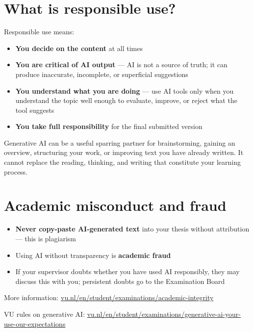 \documentclass[
  11pt,
  a4paper,
]{scrbook}
\providecommand{\tightlist}{%
  \setlength{\itemsep}{0pt}\setlength{\parskip}{0pt}}\usepackage{longtable,booktabs,array}
\begin{document}
\section{What is responsible use?}\label{what-is-responsible-use}

Responsible use means:

\begin{itemize}
\tightlist
\item
  \textbf{You decide on the content} at all times
\item
  \textbf{You are critical of AI output} --- AI is not a source of
  truth; it can produce inaccurate, incomplete, or superficial
  suggestions
\item
  \textbf{You understand what you are doing} --- use AI tools only when
  you understand the topic well enough to evaluate, improve, or reject
  what the tool suggests
\item
  \textbf{You take full responsibility} for the final submitted version
\end{itemize}

Generative AI can be a useful sparring partner for brainstorming,
gaining an overview, structuring your work, or improving text you have
already written. It cannot replace the reading, thinking, and writing
that constitute your learning process.

\section{Academic misconduct and
fraud}\label{academic-misconduct-and-fraud}

\begin{itemize}
\tightlist
\item
  \textbf{Never copy-paste AI-generated text} into your thesis without
  attribution --- this is plagiarism
\item
  Using AI without transparency is \textbf{academic fraud}
\item
  If your supervisor doubts whether you have used AI responsibly, they
  may discuss this with you; persistent doubts go to the Examination
  Board
\end{itemize}

More information:
\href{https://vu.nl/en/student/examinations/academic-integrity}{vu.nl/en/student/examinations/academic-integrity}

VU rules on generative AI:
\href{https://vu.nl/en/student/examinations/generative-ai-your-use-our-expectations}{vu.nl/en/student/examinations/generative-ai-your-use-our-expectations}
\end{document}
